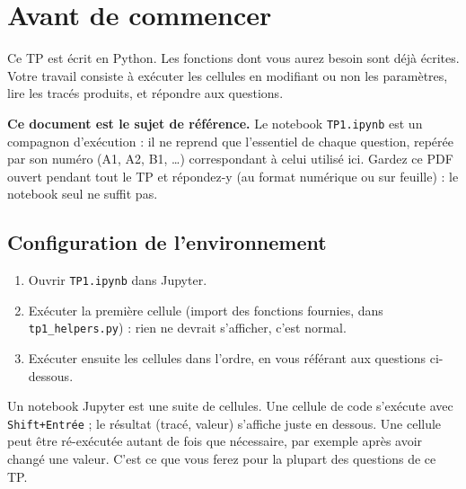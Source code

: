 \documentclass[a4paper,11pt]{article}
\title{\chapterTitle}
\author{}
\date{}
\makeatletter
\newcounter{question}[section]
\renewcommand\maketitle{{\raggedright\begin{center}
    {\Huge\bfseries\@title}
\end{center}}}
\makeatother
\begin{document}
\selectfont
\fontsize{12pt}{14pt}\selectfont

\maketitle
\thispagestyle{fancy}


\section*{Avant de commencer}

Ce TP est écrit en Python. Les fonctions dont vous
aurez besoin sont déjà écrites. Votre travail consiste à exécuter les
cellules en modifiant ou non les paramètres, lire les tracés produits, et répondre aux questions.

\textbf{Ce document est le sujet de référence.} Le notebook
\texttt{TP1.ipynb} est un compagnon d'exécution : il ne reprend que
l'essentiel de chaque question, repérée par son numéro (A1, A2, B1, \dots)
correspondant à celui utilisé ici. Gardez ce PDF ouvert pendant tout le TP
et répondez-y (au format numérique ou sur feuille) : le notebook seul ne suffit pas.

\subsection*{Configuration de l'environnement}
\begin{enumerate}
    \item Ouvrir \texttt{TP1.ipynb} dans Jupyter.
    \item Exécuter la première cellule (import des fonctions fournies,
          dans \texttt{tp1\_helpers.py}) : rien ne devrait s'afficher, c'est
          normal.
    \item Exécuter ensuite les cellules dans l'ordre, en vous référant aux
          questions ci-dessous.
\end{enumerate}

\begin{lesson}
    Un notebook Jupyter est une suite de cellules. Une cellule de code
    s'exécute avec \texttt{Shift+Entrée} ; le résultat (tracé, valeur)
    s'affiche juste en dessous. Une cellule peut être ré-exécutée autant de
    fois que nécessaire, par exemple après avoir changé une valeur. C'est
    ce que vous ferez pour la plupart des questions de ce TP.
\end{lesson}
\end{document}
